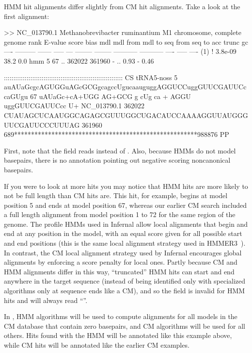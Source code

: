 HMM hit alignments differ slightly from CM hit alignments. Take a look
at the first alignment:

\begin{sreoutput}
>> NC_013790.1  Methanobrevibacter ruminantium M1 chromosome, complete genome
 rank     E-value  score  bias mdl mdl from   mdl to       seq from      seq to       acc trunc   gc
 ----   --------- ------ ----- --- -------- --------    ----------- -----------      ---- ----- ----
  (1) !   3.8e-09   38.2   0.0 hmm        5       67 ..      362022      361960 - .. 0.93     - 0.46

                     ::::::::::::::::::::::::::::::::::::::::::::::::::::::::::::::: CS
   tRNA5-noss      5 auAUaGcgcAGUGGuAGcGCGgcagccUgucaauguggAGGUCCuggGUUCGAUUCccaGUgu 67    
                      uAUaGc+cA+UGG AG+GCG   g cUg ca  +   AGGU  uggGUUCGAUUCcc  U+ 
  NC_013790.1 362022 CUAUAGCUCAAUGGCAGAGCGUUUGGCUGACAUCCAAAAGGUUAUGGGUUCGAUUCCCUUUAG 361960
                     689******************************************************988876 PP
\end{sreoutput}

First, note that the  field reads  instead of
. Also, because HMMs do not model basepairs, there is no
 annotation pointing out negative scoring noncanonical
basepairs.

If you were to look at more hits you may notice that HMM hits are
more likely to not be full length than CM hits are. This hit, for
example, begins at model position 5 and ends at model position 67,
whereas our earlier CM search included a full length alignment from
model position 1 to 72 for the same region of the genome. The profile
HMMs used in Infernal allow local alignments that begin and end at any
position in the model, with an equal score given for all possible
start and end positions (this is the same local alignment strategy
used in HMMER3~\citep{Eddy08}). In contrast, the CM local alignment
strategy used by Infernal encourages global alignments by enforcing a
score penalty for local ones. Partly because CM and HMM alignments
differ in this way, ``truncated'' HMM hits can start and end anywhere
in the target sequence (instead of being identified only with
specialized algorithms only at sequence ends like a CM), and so the
 field is invalid for HMM hits and will always read
``\otext{-}''.

In , HMM algorithms will be used to compute alignments
for all models in the CM database that contain zero basepairs, and CM
algorithms will be used for all others. Hits found with the HMM will
be annotated like this example above, while CM hits will be annotated
like the earlier CM examples.

